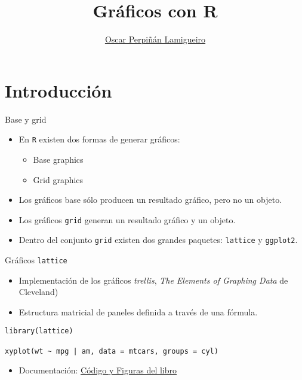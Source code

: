 \documentclass[aspectratio=169, usenames,svgnames,dvipsnames]{beamer}
\author{\href{https://oscarperpinan.github.io}{Oscar Perpiñán Lamigueiro}}
\date{}
\title{Gráficos con R}
\institute[UPM]{Universidad Politécnica de Madrid}
\begin{document}
\maketitle


\section{Introducción}
\label{sec:orgfd0e472}
\begin{frame}[label={sec:org2785367},fragile]{Base y grid}
 \begin{itemize}
\item En \texttt{R} existen dos formas de generar gráficos:
\begin{itemize}
\item Base graphics
\item Grid graphics
\end{itemize}
\item Los gráficos base sólo producen un resultado gráfico, pero no un objeto.
\item Los gráficos \texttt{grid} generan un resultado gráfico \alert{y} un objeto.
\item Dentro del conjunto \texttt{grid} existen dos grandes paquetes: \texttt{lattice} y \texttt{ggplot2}.
\end{itemize}
\end{frame}

\begin{frame}[label={sec:orgf871320},fragile]{Gráficos \texttt{lattice}}
 \begin{itemize}
\item Implementación de los gráficos \emph{trellis}, \emph{The Elements of Graphing Data} de Cleveland)

\item Estructura matricial de paneles definida a través de una fórmula.
\end{itemize}

\lstset{language=r,label= ,caption= ,captionpos=b,numbers=none}
\begin{lstlisting}
library(lattice)

xyplot(wt ~ mpg | am, data = mtcars, groups = cyl)
\end{lstlisting}

\begin{itemize}
\item Documentación: \href{http://lmdvr.r-forge.r-project.org/figures/figures.html}{Código y Figuras del libro}
\end{itemize}
\end{frame}
\end{document}
